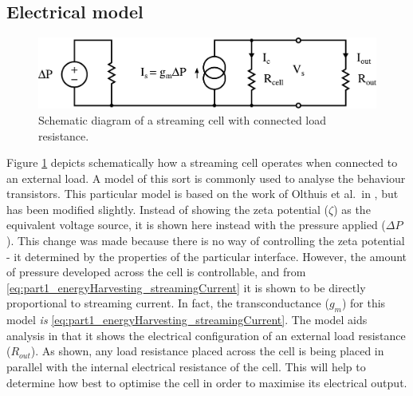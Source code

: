 

  \subsection{Electrical model}
    \label{sub:part1_energyHarvesting_generalAnalysis_electricalModel}


    \begin{figure}
        \centering
            \includegraphics[width=\textwidth]{content/pt1/01-PowerHarvesting/graphics/StreamingCell_EquivalentCircuit_output}
        \caption{\label{fig:StreamingCell_Schematic-representation}Schematic diagram of a streaming cell with connected load resistance.}
    \end{figure}
    Figure \ref{fig:StreamingCell_Schematic-representation} depicts schematically how a streaming cell operates when connected to an external load.
    A model of this sort is commonly used to analyse the behaviour transistors.
    This particular model is based on the work of Olthuis et al.\ in \cite{Olthuis2005}, but has been modified slightly.
    Instead of showing the zeta potential ($\zeta$) as the equivalent voltage source, it is shown here instead with the pressure applied ($\Delta P$).
    This change was made because there is no way of controlling the zeta potential - it determined by the properties of the particular interface.
    However, the amount of pressure developed across the cell is controllable, and from \cref{eq:part1_energyHarvesting_streamingCurrent} it is shown to be directly proportional to streaming current.
    In fact, the transconductance ($g_{m}$) for this model \emph{is} \cref{eq:part1_energyHarvesting_streamingCurrent}.
    The model aids analysis in that it shows the electrical configuration of an external load resistance ($R_{out}$).
    As shown, any load resistance placed across the cell is being placed in parallel with the internal electrical resistance of the cell.
    This will help to determine how best to optimise the cell in order to maximise its electrical output.

